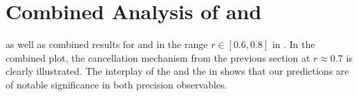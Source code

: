 \chapter{Combined Analysis of {\eedm} and {\nedm}}
\label{ch:combined-eEDM-nEDM}

as well as combined results for {\eedm} and {\nedm} in the range \(r \in [0.6, 0.8] \) in .
In the combined plot, the {\eedm} cancellation mechanism from the previous section at \(r \approx 0.7 \) is clearly illustrated.
The interplay of the {\nedm} and the {\eedm} in  shows that our predictions are of notable significance in both precision observables.

\clearpage
